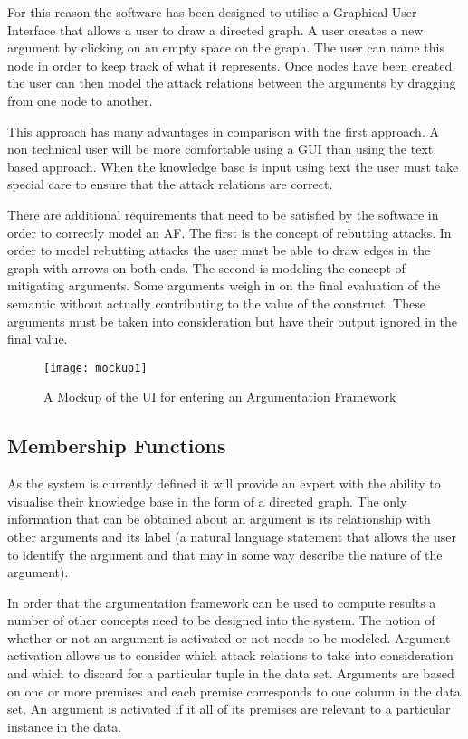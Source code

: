 For this reason the software has been designed to utilise a Graphical User Interface that allows a user to draw a directed graph. A user creates a new argument by clicking on an empty space on the graph. The user can name this node in order to keep track of what it represents. Once nodes have been created the user can then model the attack relations between the arguments by dragging from one node to another.

This approach has many advantages in comparison with the first approach. A non technical user will be more comfortable using a GUI than using the text based approach. When the knowledge base is input using text the user must take special care to ensure that the attack relations are correct.

There are additional requirements that need to be satisfied by the software in order to correctly model an AF. The first is the concept of rebutting attacks. In order to model rebutting attacks the user must be able to draw edges in the graph with arrows on both ends. The second is modeling the concept of mitigating arguments. Some arguments weigh in on the final evaluation of the semantic without actually contributing to the value of the construct. These arguments must be taken into consideration but have their output ignored in the final value. 

\begin{figure}[h]
    \centering
    \texttt{[image: mockup1]}
    \caption{A Mockup of the UI for entering an Argumentation Framework}
    \label{fig:mesh1}
\end{figure}

\subsection{Membership Functions}

As the system is currently defined it will provide an expert with the ability to visualise their knowledge base in the form of a directed graph. The only information that can be obtained about an argument is its relationship with other arguments and its label (a natural language statement that allows the user to identify the argument and that may in some way describe the nature of the argument). 

In order that the argumentation framework can be used to compute results a number of other concepts need to be designed into the system. The notion of whether or not an argument is activated or not needs to be modeled. Argument activation allows us to consider which attack relations to take into consideration and which to discard for a particular tuple in the data set. Arguments are based on one or more premises and each premise corresponds to one column in the data set. An argument is activated if it all of its premises are relevant to a particular instance in the data. 

